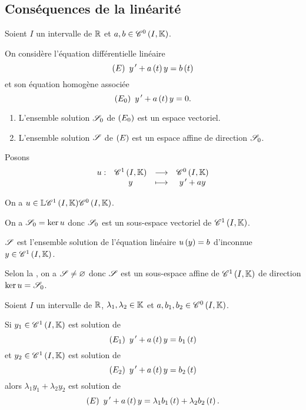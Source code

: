 \subsection{Conséquences de la linéarité}

\begin{prop}
Soient \(I\) un intervalle de \(\mathbb{R}\) et \(a,b\in\mathscr{C}^{0}\left(I,\mathbb{K}\right)\).

On considère l'équation différentielle linéaire \[\left(E\right)~y^{\,\prime}+a\left(t\right)y=b\left(t\right)\] et son équation homogène associée \[\left(E_0\right)~y^{\,\prime}+a\left(t\right)y=0.\]

\begin{enumerate}
\item L'ensemble solution \(\mathscr{S}_0\) de \(\left(E_0\right)\) est un espace vectoriel. \\

\item L'ensemble solution \(\mathscr{S}\) de \(\left(E\right)\) est un espace affine de direction \(\mathscr{S}_0\).
\end{enumerate}
\end{prop}

\begin{dem}
Posons \[\begin{array}[t]{cccc}u : & \mathscr{C}^{1}\left(I,\mathbb{K}\right) & \longrightarrow & \mathscr{C}^{0}\left(I,\mathbb{K}\right) \\ & y & \longmapsto & y^{\,\prime}+ay\end{array}\]

On a \(u\in\mathbb{L}{\mathscr{C}^{1}\left(I,\mathbb{K}\right)}{\mathscr{C}^{0}\left(I,\mathbb{K}\right)}\).

On a \(\mathscr{S}_0=\ker u\) donc \(\mathscr{S}_0\) est un sous-espace vectoriel de \(\mathscr{C}^{1}\left(I,\mathbb{K}\right)\).

\(\mathscr{S}\) est l'ensemble solution de l'équation linéaire \(u\left(y\right)=b\) d'inconnue \(y\in\mathscr{C}^{1}\left(I,\mathbb{K}\right)\).

Selon la , on a \(\mathscr{S}\not=\varnothing\) donc \(\mathscr{S}\) est un sous-espace affine de \(\mathscr{C}^{1}\left(I,\mathbb{K}\right)\) de direction \(\ker u=\mathscr{S}_0\).
\end{dem}

\begin{prop}
Soient \(I\) un intervalle de \(\mathbb{R}\), \(\lambda_1,\lambda_2\in\mathbb{K}\) et \(a,b_1,b_2\in\mathscr{C}^{0}\left(I,\mathbb{K}\right)\).

Si \(y_1\in\mathscr{C}^{1}\left(I,\mathbb{K}\right)\) est solution de \[\left(E_1\right)~y^{\,\prime}+a\left(t\right)y=b_1\left(t\right)\] et \(y_2\in\mathscr{C}^{1}\left(I,\mathbb{K}\right)\) est solution de \[\left(E_2\right)~y^{\,\prime}+a\left(t\right)y=b_2\left(t\right)\] alors \(\lambda_1y_1+\lambda_2y_2\) est solution de \[\left(E\right)~y^{\,\prime}+a\left(t\right)y=\lambda_1b_1\left(t\right)+\lambda_2b_2\left(t\right).\]
\end{prop}

